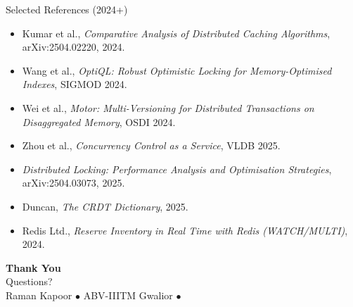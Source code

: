 \documentclass[aspectratio=169, 11pt]{beamer}
\begin{document}
\begin{frame}{Selected References (2024+)}
\footnotesize
\begin{itemize}
    \item Kumar et al., \emph{Comparative Analysis of Distributed Caching Algorithms}, arXiv:2504.02220, 2024.
    \item Wang et al., \emph{OptiQL: Robust Optimistic Locking for Memory-Optimised Indexes}, SIGMOD 2024.
    \item Wei et al., \emph{Motor: Multi-Versioning for Distributed Transactions on Disaggregated Memory}, OSDI 2024.
    \item Zhou et al., \emph{Concurrency Control as a Service}, VLDB 2025.
    \item \emph{Distributed Locking: Performance Analysis and Optimisation Strategies}, arXiv:2504.03073, 2025.
    \item Duncan, \emph{The CRDT Dictionary}, 2025.
    \item Redis Ltd., \emph{Reserve Inventory in Real Time with Redis (WATCH/MULTI)}, 2024.
\end{itemize}
\end{frame}

\begin{frame}
\begin{center}
{\Huge\bfseries Thank You}\\[1em]
{\Large Questions?}\\[2em]
{\small Raman Kapoor \quad $\bullet$ \quad ABV-IIITM Gwalior \quad $\bullet$ }
\end{center}
\end{frame}
\end{document}

